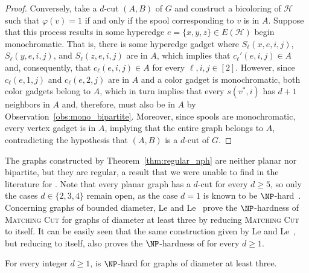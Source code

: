 \begin{proof}
    Conversely, take a $d$-cut $(A, B)$ of $G$ and construct a bicoloring of $\mathcal{H}$ such that $\varphi(v) = 1$ if and only if the spool corresponding to $v$ is in $A$.
    Suppose that this process results in some hyperedge $e = \{x, y, z\} \in E(\mathcal{H})$ begin monochromatic.
    That is, there is some hyperedge gadget where $S_{\ell}(x, e, i, j)$, $S_{\ell}(y, e, i, j)$, and $S_{\ell}(z, e, i, j)$ are in $A$, which implies that $c_{\ell}'(e, i, j) \in A$ and, consequently, that $c_{\ell}(e, i, j) \in A$ for every $\ell,i,j \in [2]$.
    However, since $c_{\ell}(e, 1, j)$ and $c_{\ell}(e, 2, j)$ are in $A$ and a color gadget is monochromatic, both color gadgets belong to $A$, which in turn implies that every $s(v^*, i)$ has $d+1$ neighbors in $A$ and, therefore, must also be in $A$ by Observation~\ref{obs:mono_bipartite}.
    Moreover, since spools are monochromatic, every vertex gadget is in $A$, implying that the entire graph belongs to $A$, contradicting the hypothesis that $(A, B)$ is a $d$-cut of $G$.
\end{proof}


The graphs constructed by Theorem~\ref{thm:regular_nph} are neither planar nor bipartite, but they are regular, a result that we were unable to find in the literature for .
Note that every planar graph has a $d$-cut for every $d \geq 5$, so only the cases $d \in \{2,3,4\}$ remain open, as the case $d=1$ is known to be $\NP$-hard~\cite{matching_cut_planar}. %
Concerning graphs of bounded diameter, Le and Le~\cite{matching_cut_diameter} prove the $\NP$-hardness of \textsc{Matching Cut} for graphs of diameter at least three by reducing \textsc{Matching Cut} to itself.  It can be easily seen that the same construction given by Le and Le~\cite{matching_cut_diameter}, but reducing   to itself, also proves the $\NP$-hardness of  for every $d \geq 1$. %


\begin{corollary}
    For every integer $d \geq 1$,  is $\NP$-hard for graphs of diameter at least three.
\end{corollary}

